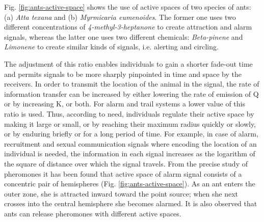 Fig. \ref{fig:ants-active-space} shows the use of active spaces of two species of ants: (a) {\em Atta texana} and (b) {\em Myrmicaria eumenoides}.  The former one uses two different concentrations of {\em 4-methyl-3-heptanone} to create attraction and alarm signals, whereas the latter one uses two different chemicals: {\em Beta-pinene} and {\em Limonene} to create similar kinds of signals, i.e. alerting and circling.
 
The adjustment of this ratio enables individuals to gain a shorter fade-out time and permits signals to be more sharply pinpointed in time and space by the receivers. In order to transmit the location of the animal in the signal, the rate of information transfer can be increased by either lowering the rate of emission of Q or by increasing K, or both. For alarm and trail systems a lower value of this ratio is used. Thus, according to need, individuals regulate their active space by making it large or small, or by reaching their maximum radius quickly or slowly, or by enduring briefly or for a long period of time. For example, in case of alarm, recruitment and sexual communication signals where encoding the location of an individual is needed, the information in each signal increases as the logarithm of the square of distance over which the signal travels. From the precise study of pheromones it has been found that active space of alarm signal consists of a concentric pair of hemispheres (Fig. \ref{fig:ants-active-space}). As an ant enters the outer zone, she is attracted inward toward the point source; when she next crosses into the central hemisphere she becomes alarmed. It is also observed that ants can release pheromones with different active spaces.

